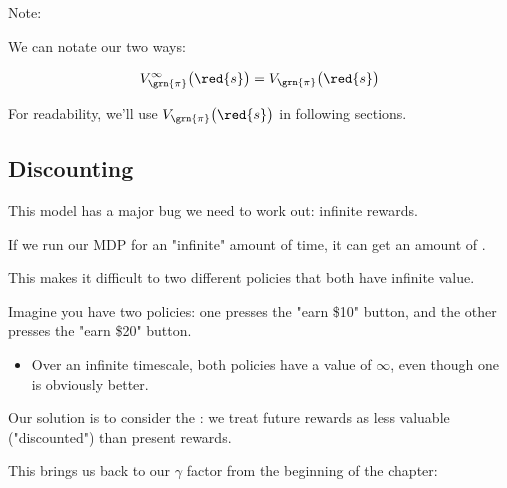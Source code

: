         Note:\\

        \begin{notation}
            We can notate our  two ways:

            \begin{equation*}
                V_{\grn{\pi}}^{\infty}\big(\red{s} \big) = 
                V_{\grn{\pi}}\big(\red{s} \big)
            \end{equation*}

            For readability, we'll use $V_{\grn{\pi}}\big(\red{s} \big)$ in following sections.
        \end{notation}



    \phantom{}

    

    \subsection{Discounting}



        This model has a major bug we need to work out: infinite rewards.\\

        \begin{concept}
            If we run our MDP for an "infinite" amount of time, it can get an  amount of .

            This makes it difficult to  two different policies that both have infinite value.
        \end{concept}

        \miniex Imagine you have two policies: one presses the "earn \$10" button, and the other presses the "earn \$20" button.

        \begin{itemize}
            \item Over an infinite timescale, both policies have a value of $\infty$, even though one is obviously better.
        \end{itemize}

        Our solution is to consider the : we treat future rewards as less valuable ("discounted") than present rewards. 
        
        This brings us back to our $\gamma$ factor from the beginning of the chapter:\\

